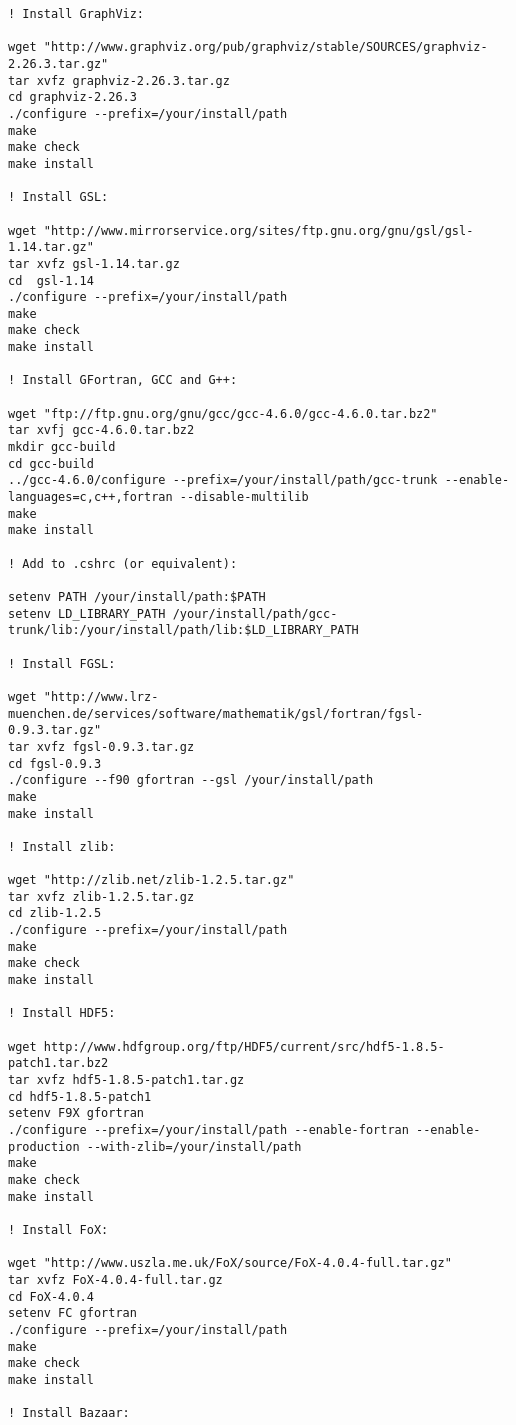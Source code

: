 \begin{lstlisting}[language=simple,stringstyle=\ttfamily,commentstyle=\itshape]
! Install GraphViz:

wget "http://www.graphviz.org/pub/graphviz/stable/SOURCES/graphviz-2.26.3.tar.gz"
tar xvfz graphviz-2.26.3.tar.gz
cd graphviz-2.26.3
./configure --prefix=/your/install/path
make
make check
make install

! Install GSL:

wget "http://www.mirrorservice.org/sites/ftp.gnu.org/gnu/gsl/gsl-1.14.tar.gz"
tar xvfz gsl-1.14.tar.gz
cd  gsl-1.14
./configure --prefix=/your/install/path
make
make check
make install

! Install GFortran, GCC and G++:

wget "ftp://ftp.gnu.org/gnu/gcc/gcc-4.6.0/gcc-4.6.0.tar.bz2"
tar xvfj gcc-4.6.0.tar.bz2
mkdir gcc-build
cd gcc-build
../gcc-4.6.0/configure --prefix=/your/install/path/gcc-trunk --enable-languages=c,c++,fortran --disable-multilib
make
make install

! Add to .cshrc (or equivalent):

setenv PATH /your/install/path:$PATH                                                                                           
setenv LD_LIBRARY_PATH /your/install/path/gcc-trunk/lib:/your/install/path/lib:$LD_LIBRARY_PATH                                                                     

! Install FGSL:

wget "http://www.lrz-muenchen.de/services/software/mathematik/gsl/fortran/fgsl-0.9.3.tar.gz"
tar xvfz fgsl-0.9.3.tar.gz
cd fgsl-0.9.3
./configure --f90 gfortran --gsl /your/install/path
make
make install

! Install zlib:

wget "http://zlib.net/zlib-1.2.5.tar.gz"
tar xvfz zlib-1.2.5.tar.gz
cd zlib-1.2.5
./configure --prefix=/your/install/path
make
make check
make install

! Install HDF5:

wget http://www.hdfgroup.org/ftp/HDF5/current/src/hdf5-1.8.5-patch1.tar.bz2
tar xvfz hdf5-1.8.5-patch1.tar.gz
cd hdf5-1.8.5-patch1
setenv F9X gfortran
./configure --prefix=/your/install/path --enable-fortran --enable-production --with-zlib=/your/install/path
make
make check
make install

! Install FoX:

wget "http://www.uszla.me.uk/FoX/source/FoX-4.0.4-full.tar.gz"
tar xvfz FoX-4.0.4-full.tar.gz
cd FoX-4.0.4
setenv FC gfortran
./configure --prefix=/your/install/path
make
make check
make install

! Install Bazaar:


\end{lstlisting}
